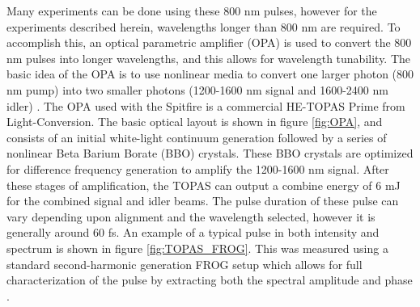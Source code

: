 Many experiments can be done using these 800 nm pulses, however for the experiments described herein, wavelengths longer than 800 nm are required.  To  accomplish this, an optical parametric amplifier (OPA) is used to convert the 800 nm pulses into longer wavelengths, and this allows for wavelength tunability.  The basic idea of the OPA is to use nonlinear media to convert one larger photon (800 nm pump) into two smaller photons (1200-1600 nm signal and 1600-2400 nm idler) \cite{boydNonlinearOptics2008}.  The OPA used with the Spitfire is a commercial HE-TOPAS Prime from Light-Conversion.  The basic optical layout is shown in figure \ref{fig:OPA}, and consists of an initial white-light continuum generation followed by a series of nonlinear Beta Barium Borate (BBO) crystals.  These BBO crystals are optimized for difference frequency generation to amplify the 1200-1600 nm signal.  After these stages of amplification, the TOPAS can output a combine energy of 6 mJ for the combined signal and idler beams.  The pulse duration of these pulse can vary depending upon alignment and the wavelength selected, however it is generally around 60 fs. An example of a typical pulse in both intensity and spectrum is shown in figure \ref{fig:TOPAS_FROG}.  This was measured using a standard second-harmonic generation FROG setup which allows for full characterization of the pulse by extracting both the spectral amplitude and phase \cite{trebinoFrequencyresolvedOpticalGating2000}.

